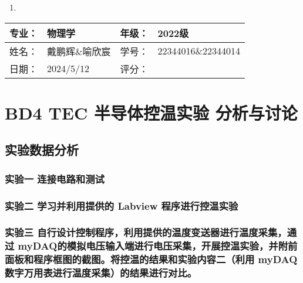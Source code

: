\documentclass[dvipsnames, svgnames,a4paper,11pt]{article}
\begin{document}
\begin{enumerate}
	\item 
\end{enumerate}
	

\clearpage
\begin{table}
	\renewcommand\arraystretch{1.7}
	\begin{tabularx}{\textwidth}{|X|X|X|X|}
	\hline
	专业：& 物理学 &年级：& 2022级\\
	\hline
	姓名： & 戴鹏辉\&喻欣宸 & 学号：& 22344016\&22344014\\
	\hline
    日期：& 2024/5/12 & 评分： &\\
	\hline
	\end{tabularx}
\end{table}

\section{BD4 \quad TEC 半导体控温实验 \quad\heiti 分析与讨论}

\subsection{实验数据分析}


\subsubsection{实验一 \quad 连接电路和测试}
	



\subsubsection{实验二 \quad 学习并利用提供的 Labview 程序进行控温实验}





\subsubsection{实验三 \quad 自行设计控制程序，利用提供的温度变送器进行温度采集，通过 myDAQ的模拟电压输入端进行电压采集，开展控温实验，并附前面板和程序框图的截图。将控温的结果和实验内容二（利用 myDAQ 数字万用表进行温度采集）的结果进行对比。}

				


	
	
\end{document}
